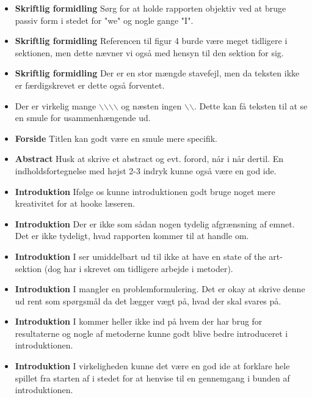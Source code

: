 \documentclass[11pt, fleqn, titlepage]{article}
\begin{document}
	
	\begin{itemize}
		\item \textbf{Skriftlig formidling} Sørg for at holde rapporten objektiv ved at bruge passiv form i stedet for "we" og nogle gange "I".
		
		\item \textbf{Skriftlig formidling} Referencen til figur 4 burde være meget tidligere i sektionen, men dette nævner vi også med hensyn til den sektion for sig.
		
		\item \textbf{Skriftlig formidling} Der er en stor mængde stavefejl, men da teksten ikke er færdigskrevet er dette også forventet.
		
		\item Der er virkelig mange $\backslash$$\backslash$$\backslash$$\backslash$ og næsten ingen $\backslash$$\backslash$. Dette kan få teksten til at se en smule for usammenhængende ud.
		
		\item \textbf{Forside} Titlen kan godt være en smule mere specifik.
		
		\item \textbf{Abstract} Husk at skrive et abstract og evt. forord, når i når dertil. En indholdsfortegnelse med højst 2-3 indryk kunne også være en god ide.
		
		\item \textbf{Introduktion} Ifølge os kunne introduktionen godt bruge noget mere kreativitet for at hooke læseren.
		
		\item \textbf{Introduktion} Der er ikke som sådan nogen tydelig afgrænsning af emnet. Det er ikke tydeligt, hvad rapporten kommer til at handle om.
		
		\item \textbf{Introduktion} I ser umiddelbart ud til ikke at have en state of the art-sektion (dog har i skrevet om tidligere arbejde i metoder).
		
		\item \textbf{Introduktion} I mangler en problemformulering. Det er okay at skrive denne ud rent som spørgsmål da det lægger vægt på, hvad der skal svares på.
		
		\item \textbf{Introduktion} I kommer heller ikke ind på hvem der har brug for resultaterne og nogle af metoderne kunne godt blive bedre introduceret i introduktionen.
		
		\item \textbf{Introduktion} I virkeligheden kunne det være en god ide at forklare hele spillet fra starten af i stedet for at henvise til en gennemgang i bunden af introduktionen.
		

\end{itemize}
\end{document}
